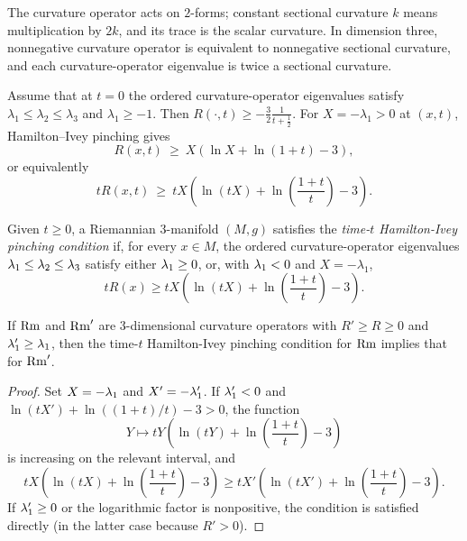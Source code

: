 The curvature operator acts on $2$-forms; constant sectional curvature $k$
means multiplication by $2k$, and its trace is the scalar curvature. In
dimension three, nonnegative curvature operator is equivalent to nonnegative
sectional curvature, and each curvature-operator eigenvalue is twice a
sectional curvature.

Assume that at $t=0$ the ordered curvature-operator eigenvalues satisfy
$\lambda_1\leq\lambda_2\leq\lambda_3$ and $\lambda_1\geq-1$. Then
$R(\cdot,t)\geq-\frac32\frac1{t+\frac12}$. For $X=-\lambda_1>0$ at $(x,t)$,
Hamilton--Ivey pinching gives \cite[Theorem 4.1]{Hamiltonn}
\begin{equation}
R(x,t)\: \ge \:X\left(\ln X+\ln(1+t)-3\right),
\end{equation}
or equivalently
\begin{equation} \label{estimate}
tR(x,t)\: \ge \:tX\left(\ln(tX)+\ln(\frac{1+t}{t})-3\right).
\end{equation}

\begin{definition}
  \label{def:kl-almost-nonnegative-curvature-positivity-curvature-operators}

 \label{HamIvey}

Given $t\geq0$, a Riemannian $3$-manifold $(M,g)$ satisfies the
\emph{time-$t$ Hamilton-Ivey pinching condition} if, for every $x\in M$,
the ordered curvature-operator eigenvalues
$\lambda_1\leq\lambda_2\leq\lambda_3$ satisfy either $\lambda_1\geq0$, or, with
$\lambda_1<0$ and $X=-\lambda_1$,
\[tR(x)\geq tX\left(\ln(tX)+\ln\left(\frac{1+t}{t}\right)-3\right).\]
\end{definition}

\begin{lemma}
  \label{lem:kl-almost-nonnegative-curvature-monotonicity-scalar-curvature}

\label{lempinchingmonotonic}
If $\operatorname{Rm}$ and $\operatorname{Rm}'$ are $3$-dimensional curvature operators with
$R'\geq R\geq0$ and $\lambda_1'\geq\lambda_1$, then the time-$t$ Hamilton-Ivey
pinching condition for $\operatorname{Rm}$ implies that for $\operatorname{Rm}'$.
\end{lemma}
\begin{proof}
\sketch
Set $X=-\lambda_1$ and $X'=-\lambda_1'$. If $\lambda_1'<0$ and
$\ln(tX')+\ln((1+t)/t)-3>0$, the function
\begin{equation}
Y\mapsto tY\left(\ln(tY)+\ln\left(\frac{1+t}{t}\right)-3\right)
\end{equation}
is increasing on the relevant interval, and
\begin{equation}
tX\left(\ln(tX)+\ln\left(\frac{1+t}{t}\right)-3\right)
\geq tX'\left(\ln(tX')+\ln\left(\frac{1+t}{t}\right)-3\right).
\end{equation}
If $\lambda_1'\geq0$ or the logarithmic factor is nonpositive, the condition is
satisfied directly (in the latter case because $R'>0$).
\end{proof}


